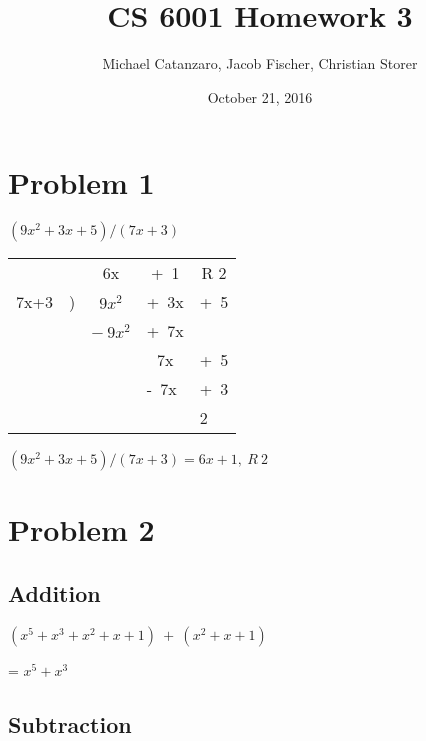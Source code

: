 \documentclass[letterpaper]{article}
\title{CS 6001 Homework 3}
\author{Michael Catanzaro, Jacob Fischer, Christian Storer}
\date{October 21, 2016}
\begin{document}
\maketitle

\section{Problem 1}


\((9x^2+3x+5) / (7x+3)\)

\bigskip

\begin{tabular}{clccc}
                     &                      & 6x                   & +\ 1                      & R 2                    \\ \hhline{~----}
7x+3                 & )                    & \(9x^2\)             & +\ 3x                     & +\ 5                     \\
                     &                      & \(-\ 9x^2\)             & +\ 7x                     &                        \\ \hhline{~~---}
                     &                      &                      & 7x                      & +\ 5                     \\
\multicolumn{1}{l}{} & \multicolumn{1}{l}{} & \multicolumn{1}{l}{} & \multicolumn{1}{l}{-\ 7x} & \multicolumn{1}{l}{+\ 3} \\ \hhline{~~~--}
\multicolumn{1}{l}{} & \multicolumn{1}{l}{} & \multicolumn{1}{l}{} & \multicolumn{1}{l}{}    & \multicolumn{1}{l}{2} 
\end{tabular}

\((9x^2+3x+5) / (7x+3) = 6x + 1,\ R\ 2\)


\section{Problem 2}

\subsection{Addition}

\((x^5 + x^3 + x^2 + x + 1)\ +\ (x^2 + x + 1)\)

= \(x^5 + x^3\)

\subsection{Subtraction}
\end{document}

